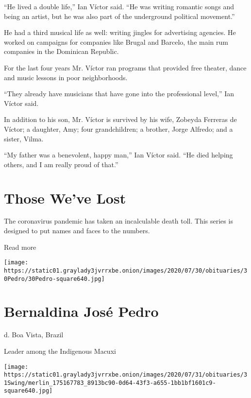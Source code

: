 ``He lived a double life,'' Ian Víctor said. ``He was writing romantic
songs and being an artist, but he was also part of the underground
political movement.''

He had a third musical life as well: writing jingles for advertising
agencies. He worked on campaigns for companies like Brugal and Barcelo,
the main rum companies in the Dominican Republic.

For the last four years Mr. Víctor ran programs that provided free
theater, dance and music lessons in poor neighborhoods.

``They already have musicians that have gone into the professional
level,'' Ian Víctor said.

In addition to his son, Mr. Víctor is survived by his wife, Zobeyda
Ferreras de Víctor; a daughter, Amy; four grandchildren; a brother,
Jorge Alfredo; and a sister, Vilma.

``My father was a benevolent, happy man,'' Ian Víctor said. ``He died
helping others, and I am really proud of that.''

\href{https://www.nytimes3xbfgragh.onion/interactive/2020/obituaries/people-died-coronavirus-obituaries.html?action=click\&pgtype=Article\&state=default\&region=BELOW_MAIN_CONTENT\&context=covid_obits_promo}{}

\hypertarget{those-weve-lost}{%
\section{Those We've Lost}\label{those-weve-lost}}

The coronavirus pandemic has taken an incalculable death toll. This
series is designed to put names and faces to the numbers.

Read more

\texttt{[image: https://static01.graylady3jvrrxbe.onion/images/2020/07/30/obituaries/30Pedro/30Pedro-square640.jpg]}

\hypertarget{bernaldina-josuxe9-pedro}{%
\section{Bernaldina José Pedro}\label{bernaldina-josuxe9-pedro}}

d. Boa Vista, Brazil

Leader among the Indigenous Macuxi

\texttt{[image: https://static01.graylady3jvrrxbe.onion/images/2020/07/31/obituaries/31Swing/merlin\_175167783\_8913bc90-0d64-43f3-a655-1bb1bf1601c9-square640.jpg]}

